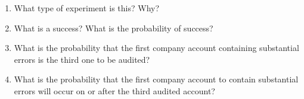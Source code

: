 \documentclass[11pt]{article}
\theoremstyle{definition}
\begin{document}
\begin{enumerate}
	\item What type of experiment is this? Why?
	\item What is a success? What is the probability of success?
	\item What is the probability that the first company account containing substantial errors is the third one to be audited?
	\item What is the probability that the first company account to contain substantial errors will occur on or after the third audited account?
\end{enumerate}
\end{document}
